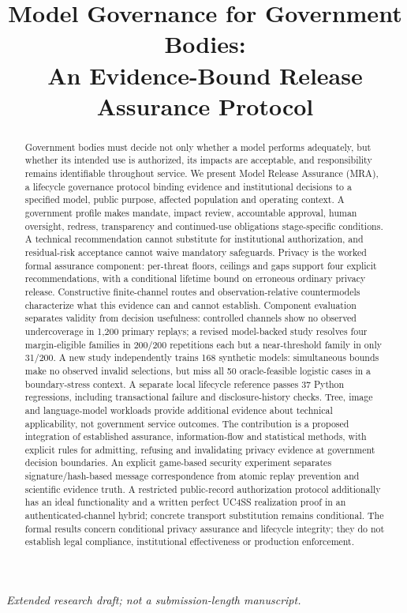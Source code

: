 \documentclass[conference,compsoc]{IEEEtran}
\title{Model Governance for Government Bodies:\\An Evidence-Bound Release Assurance Protocol}
\author{}
\begin{document}
\maketitle


\begin{abstract}
Government bodies must decide not only whether a model performs adequately,
but whether its intended use is authorized, its impacts are acceptable, and
responsibility remains identifiable throughout service. We present Model
Release Assurance (MRA), a lifecycle governance protocol binding evidence
and institutional decisions to a specified model, public purpose, affected
population and operating context. A government profile makes mandate,
impact review, accountable approval, human oversight, redress, transparency
and continued-use obligations stage-specific conditions. A technical
recommendation cannot substitute for institutional authorization, and
residual-risk acceptance cannot waive mandatory safeguards. Privacy is the
worked formal assurance component: per-threat floors, ceilings and gaps
support four explicit recommendations, with a conditional lifetime bound
on erroneous ordinary privacy release. Constructive finite-channel routes
and observation-relative countermodels characterize what this evidence
can and cannot establish. Component evaluation separates validity from
decision usefulness: controlled channels show no observed undercoverage in
1,200 primary replays; a revised model-backed study resolves four
margin-eligible families in 200/200 repetitions each but a near-threshold
family in only 31/200. A new study independently trains 168 synthetic models:
simultaneous bounds make no observed invalid selections, but miss all 50
oracle-feasible logistic cases in a boundary-stress context. A separate local
lifecycle reference passes 37 Python regressions, including transactional
failure and disclosure-history checks. Tree, image and language-model workloads provide
additional evidence about technical applicability, not government service
outcomes. The contribution is a proposed integration of established assurance,
information-flow and statistical methods, with explicit rules for admitting,
refusing and invalidating privacy evidence at government decision boundaries.
An explicit game-based security experiment separates signature/hash-based message
correspondence from atomic replay prevention and scientific evidence truth.
A restricted public-record authorization protocol additionally has an ideal
functionality and a written perfect UC4SS realization proof in an
authenticated-channel hybrid; concrete transport substitution remains conditional.
The formal results concern conditional privacy assurance and lifecycle
integrity; they do not establish legal compliance, institutional effectiveness
or production enforcement.
\end{abstract}
{\raggedright\noindent\textit{Extended research draft; not a submission-length manuscript.}\par}
\medskip
\end{document}
